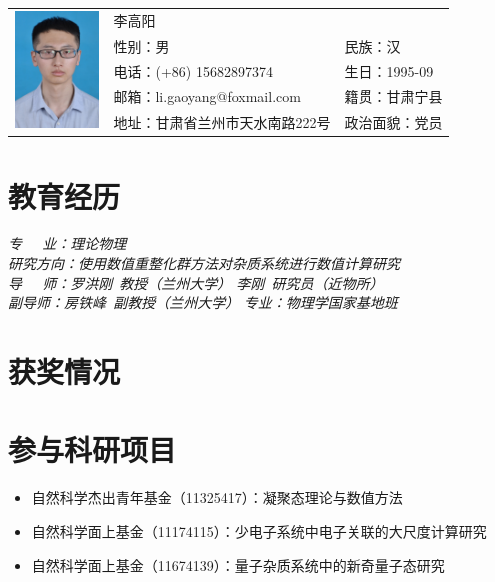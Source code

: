 \documentclass{resume}
\begin{document}

\Large{
  \begin{tabu}{ c l l }
    &
   \scshape{李高阳} &  \\
    & 性别：男 & 民族：汉 \\
    & 电话：(+86) 15682897374 & 生日：1995-09 \\
    & 邮箱：li.gaoyang@foxmail.com & 籍贯：甘肃宁县 \\
    & 地址：甘肃省兰州市天水南路222号 \hspace{40} & 政治面貌：党员
  \end{tabu}
}

\section{教育经历}
\textit{专$\quad\ \ $业：理论物理}\\
\textit{研究方向：使用数值重整化群方法对杂质系统进行数值计算研究}\\
\textit{导$\quad\ \ $师：罗洪刚\ 教授（兰州大学） 李刚\ 研究员（近物所）}\\
\textit{副\hspace{7\ccwd}导\hspace{7\ccwd}师：房铁峰\ 副教授（兰州大学）}
\textit{专业：物理学国家基地班}

\section{获奖情况}

\section{参与科研项目}
\begin{itemize}
\item 自然科学杰出青年基金（11325417）：凝聚态理论与数值方法
\item 自然科学面上基金（11174115）：少电子系统中电子关联的大尺度计算研究
\item 自然科学面上基金（11674139）：量子杂质系统中的新奇量子态研究
\end{itemize}
\end{document}

